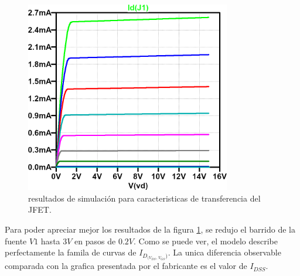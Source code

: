    \begin{figure}[!ht]
      \centering
      \includegraphics[width=0.8\textwidth]{images/transferencia-id_vds-vgs.png}
      \caption{resultados de simulación para caracteristicas de transferencia del JFET.}
      \label{fig:sim.transf}
    \end{figure}

    Para poder apreciar mejor los resultados de la figura \ref{fig:sim.transf}, se redujo el barrido de la fuente $V1$
    hasta $3V$ en pasos de $0.2V$. Como se puede ver, el modelo describe perfectamente la famila de curvas de
    $I_{D_{(V_{DS}, \, V_{GS}})}$. La unica diferencia observable comparada con la grafica presentada por el fabricante es el
    valor de $I_{DSS}$.
